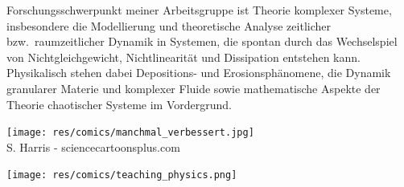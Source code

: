 \begin{multicols}{2}
Forschungsschwerpunkt meiner Arbeitsgruppe ist Theorie komplexer Systeme, insbesondere die Modellierung und theoretische Analyse zeitlicher bzw.\ raumzeitlicher Dynamik in Systemen, die spontan durch das Wechselspiel von Nichtgleichgewicht, Nichtlinearität und Dissipation entstehen kann. Physikalisch stehen dabei Depositions- und Erosionsphänomene, die Dynamik granularer Materie und komplexer Fluide sowie mathematische Aspekte der Theorie chaotischer Systeme im Vordergrund.

\begin{center}
\texttt{[image: res/comics/manchmal\_verbessert.jpg]}\\
{\footnotesize 
S. Harris - sciencecartoonsplus.com}
\end{center}
\end{multicols}

\medskip

\begin{center}
	\texttt{[image: res/comics/teaching\_physics.png]}
\end{center}

\newpage

